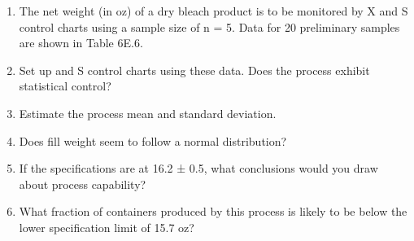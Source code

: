 	\begin{enumerate}[label=(\alph*)]
	 
\item
 The net weight (in oz) of a dry bleach product is to be monitored by X and S control charts using a sample size of n = 5. Data for 20 preliminary samples are shown in Table 6E.6.  
\item
 Set up and S control charts using these data. Does the process exhibit statistical control? 


\item
Estimate the process mean and standard deviation. 


\item
Does fill weight seem to follow a normal distribution? 


\item
If the specifications are at 16.2 ± 0.5, what conclusions would you draw about process capability? 


\item
What fraction of containers produced by this process is likely to be below the lower specification limit of 15.7 oz? 
	\end{enumerate}
	




